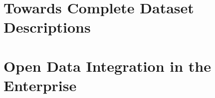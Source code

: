 \documentclass[a4paper,11pt,twoside]{ThesisStyle}
\begin{document}
\part{Towards Complete Dataset Descriptions} \label{part:dataset_profiling}






\part{Open Data Integration in the Enterprise} \label{part:data_integration}









\appendix






\chapter*{}
\chaptermark{}
\vspace{-15ex}
\end{document}
